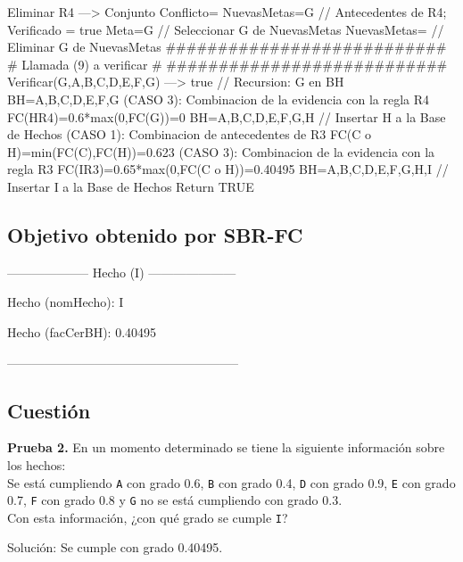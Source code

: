 \begin{listing}[language=Pascal]
	Eliminar R4 ---> Conjunto Conflicto={}
	NuevasMetas={G} // Antecedentes de R4; Verificado = true
	Meta=G // Seleccionar G de NuevasMetas
	NuevasMetas={} // Eliminar G de NuevasMetas
  ###########################
  # Llamada (9) a verificar #
  ###########################
	Verificar(G,{A,B,C,D,E,F,G}) ---> true // Recursion: G en BH
	BH={A,B,C,D,E,F,G}
	(CASO 3): Combinacion de la evidencia con la regla R4
	 FC(H{R4})=0.6*max(0,FC(G))=0
	BH={A,B,C,D,E,F,G,H} // Insertar H a la Base de Hechos
	(CASO 1): Combinacion de antecedentes de R3
	 FC(C o H)=min(FC(C),FC(H))=0.623
	(CASO 3): Combinacion de la evidencia con la regla R3
	 FC(I{R3})=0.65*max(0,FC(C o H))=0.40495
	BH={A,B,C,D,E,F,G,H,I} // Insertar I a la Base de Hechos
Return TRUE	
\end{listing}

\subsection{Objetivo obtenido por SBR-FC}
\begin{center}
\par -------------------- Hecho (I) ---------------------
\par Hecho (nomHecho): I
\par Hecho (facCerBH): 0.40495
\par --------------------------------------------------------
\end{center}

\subsection{Cuestión}
\begin{ejer}
	\textbf{Prueba 2.} En un momento determinado se tiene la siguiente información sobre los hechos:\\
	Se está cumpliendo \texttt{A} con grado 0.6, \texttt{B} con grado 0.4, \texttt{D} con grado 0.9, 
	\texttt{E} con grado 0.7, \texttt{F} con grado 0.8 y \texttt{G} no se está cumpliendo con grado 0.3. \\
	Con esta información, ¿con qué grado se cumple \texttt{I}?
\end{ejer}
\par Solución: Se cumple con grado 0.40495.